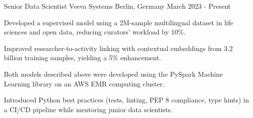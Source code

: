 

\begin{cventries}
  \cventry
    {Senior Data Scientist} %
    {Veeva Systems} %
    {Berlin, Germany} %
    {March 2023 - Present } %
	{
      \begin{cvitems} %
		\item {Developed a supervised model using a 2M-sample multilingual dataset in life sciences and open data, reducing curators' workload by 10\%.}
		\item {Improved researcher-to-activity linking with contextual embeddings from 3.2 billion training samples, yielding a 5\% enhancement.}
		\item {Both models described above were developed using the PySpark Machine Learning library on an AWS EMR computing cluster.}
		\item {Introduced Python best practices (tests, linting, PEP 8 compliance, type hints) in a CI/CD pipeline while mentoring junior data scientists.}
      \end{cvitems}
    }


\end{cventries}
